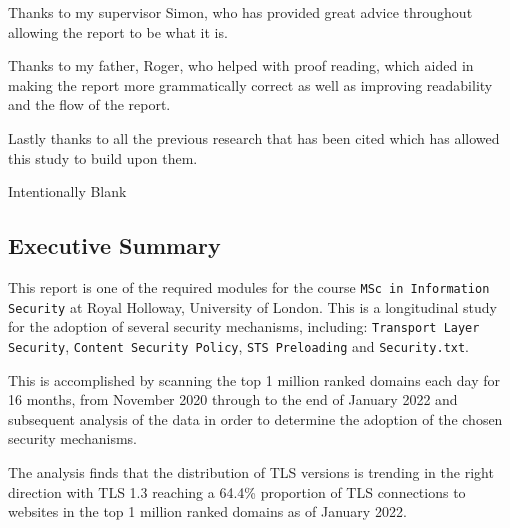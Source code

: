 \documentclass{mscreport}
\begin{document}
\noindent
Thanks to my supervisor Simon, who has provided great advice throughout allowing the report to be what it is.

\vspace{0.3cm} \noindent
Thanks to my father, Roger, who helped with proof reading, which aided in making the report more grammatically correct as well as improving readability and the flow of the report.

\vspace{0.3cm} \noindent
Lastly thanks to all the previous research that has been cited which has allowed this study to build upon  them.

\newpage

\setcounter{page}{1}
\vspace*{\fill}
\begin{center}
\begin{huge}
Intentionally Blank
\end{huge}
\end{center}
\vspace{\fill}

\newpage

\begin{center}
\section*{Executive Summary}
\end{center}

\noindent
This report is one of the required modules for the course \texttt{MSc in Information Security} at Royal Holloway, University of London. This is a longitudinal study for the adoption of several security mechanisms, including: \texttt{Transport Layer Security}, \texttt{Content Security Policy}, \texttt{STS Preloading} and \texttt{Security.txt}.

\vspace{0.3cm} \noindent
This is accomplished by scanning the top 1 million ranked domains each day for 16 months, from November 2020 through to the end of January 2022 and subsequent analysis of the data in order to determine the adoption of the chosen security mechanisms.

\vspace{0.3cm} \noindent
The analysis finds that the distribution of TLS versions is trending in the right direction with TLS 1.3 reaching a 64.4\% proportion of TLS connections to websites in the top 1 million ranked domains as of January 2022.
\end{document}
